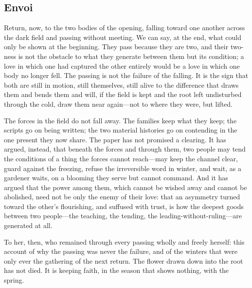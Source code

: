 \goldrule

\subsection*{Envoi}

\noindent
Return, now, to the two bodies of the opening, falling toward one another across the dark field and passing without meeting. We can say, at the end, what could only be shown at the beginning. They pass because they are two, and their two-ness is not the obstacle to what they generate between them but its condition; a love in which one had captured the other entirely would be a love in which one body no longer fell. The passing is not the failure of the falling. It is the sign that both are still in motion, still themselves, still alive to the difference that draws them and bends them and will, if the field is kept and the root left undisturbed through the cold, draw them near again---not to where they were, but lifted.

The forces in the field do not fall away. The families keep what they keep; the scripts go on being written; the two material histories go on contending in the one present they now share. The paper has not promised a clearing. It has argued, instead, that beneath the forces and through them, two people may tend the conditions of a thing the forces cannot reach---may keep the channel clear, guard against the freezing, refuse the irreversible word in winter, and wait, as a gardener waits, on a blooming they serve but cannot command. And it has argued that the power among them, which cannot be wished away and cannot be abolished, need not be only the enemy of their love: that an asymmetry turned toward the other's flourishing, and suffused with trust, is how the deepest goods between two people---the teaching, the tending, the leading-without-ruling---are generated at all.

To her, then, who remained through every passing wholly and freely herself: this account of why the passing was never the failure, and of the winters that were only ever the gathering of the next return. The flower drawn down into the root has not died. It is keeping faith, in the season that shows nothing, with the spring.
